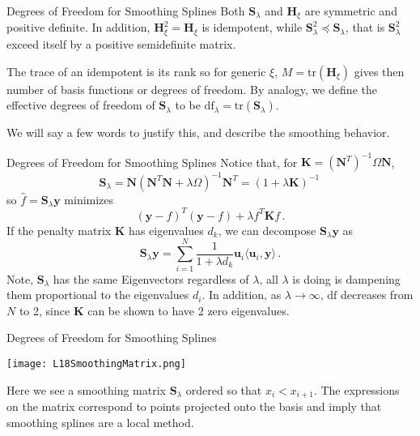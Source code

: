 \documentclass[10pt, table, dvipsnames,xcdraw,handout]{beamer}
\newcommand{\bfy}{\ensuremath{\mathbf{y}}}
\begin{document}
\begin{frame}[fragile]{Degrees of Freedom for Smoothing Splines}
Both $\mathbf{S}_\lambda$ and $\mathbf{H}_\xi$ are symmetric and positive definite. In addition, $\mathbf{H}_\xi^2 = \mathbf{H}_\xi$ is idempotent, while $\mathbf{S}_\lambda^2 \preceq \mathbf{S}_\lambda$, that is $\mathbf{S}_\lambda^2$ exceed itself by a positive semidefinite matrix. \pause

The trace of an idempotent is its rank so for generic $\xi$, $M = \text{tr}(\mathbf{H}_\xi)$ gives then number of basis functions or degrees of freedom. By analogy, we define the effective degrees of freedom of  $\mathbf{S}_\lambda$ to be $\text{df}_\lambda = \text{tr}(\mathbf{S}_\lambda)$.\pause 

We will say a few words to justify this, and describe the smoothing behavior.
\end{frame}



\begin{frame}[fragile]{Degrees of Freedom for Smoothing Splines}
Notice that, for $\mathbf{K} =  (\mathbf{N}^T)^{-1}\Omega\mathbf{N}$, 
$$
\mathbf{S}_\lambda = \mathbf{N}(\mathbf{N}^T\mathbf{N} + \lambda\Omega)^{-1}\mathbf{N}^T = (1+\lambda\mathbf{K})^{-1}\,
$$\pause 
so $\hat{f} = \mathbf{S}_\lambda\bfy$ minimizes
$$
(\bfy - {f})^T(\bfy - {f}) + \lambda f^T\mathbf{K}f\,.
$$\pause 
If the penalty matrix $\mathbf{K}$ has eigenvalues $d_k$, we can decompose $\mathbf{S}_\lambda \bfy$ as
$$
\mathbf{S}_\lambda\bfy = \sum_{i=1}^N\frac{1}{1+\lambda d_k}\mathbf{u}_i\langle\mathbf{u}_i,\bfy\rangle\,.
$$\pause
Note, $\mathbf{S}_\lambda$ has the same Eigenvectors regardless of $\lambda$, all $\lambda$ is doing is dampening them proportional to the eigenvalues $d_i$. \pause In addition, as $\lambda\to \infty$, $\text{df}$ decreases from $N$ to 2, since $\mathbf{K}$ can be shown to have 2 zero eigenvalues. 
\end{frame}



\begin{frame}[fragile]{Degrees of Freedom for Smoothing Splines}
  \begin{minipage}[t][0.5\textheight][t]{\textwidth}
	\centering \texttt{[image: L18SmoothingMatrix.png]} 
  \end{minipage}
  \vfill
\begin{minipage}[t][0.5\textheight][t]{\textwidth}
Here we see a smoothing matrix $\mathbf{S}_\lambda$ ordered so that $x_i<x_{i+1}$. The expressions on the matrix correspond to points projected onto the basis and imply that smoothing splines are a local method.
\end{minipage}
\end{frame}
\end{document}

